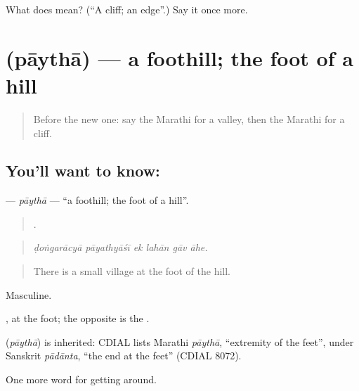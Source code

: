 \begin{tcolorbox}[breakable,colback=teal!4,colframe=teal!35!black,title={Before you move on}]
What does  mean? (\textquotedblleft{}A cliff; an edge\textquotedblright{}.) Say it once more.
\end{tcolorbox}
\section[\texorpdfstring{\mr{पायथा} (pāythā)}{पायथा (pāythā)}]{ (pāythā) — a foothill; the foot of a hill}

\label{lesson:MR-C442-paytha}



\begin{quote}
Before the new one: say the Marathi for a valley, then the Marathi for a cliff.
\end{quote}

\subsection*{You'll want to know: }
\textbf{} — \emph{pāythā} — \textquotedblleft{}a foothill; the foot of a hill\textquotedblright{}.

\begin{quote}
     .
\end{quote}

\begin{quote}
\emph{ḍoṅgarācyā pāyathyāśī ek lahān gāv āhe.}
\end{quote}

\begin{quote}
There is a small village at the foot of the hill.
\end{quote}

Masculine.

, at the foot; the opposite is the .

\begin{cousinweb}
\textbf{} (\emph{pāythā}) is inherited: CDIAL lists Marathi \emph{pāythā}, \textquotedblleft{}extremity of the feet\textquotedblright{}, under Sanskrit \emph{pādānta}, \textquotedblleft{}the end at the feet\textquotedblright{} (CDIAL 8072).
\end{cousinweb}

\begin{grammarlens}[title={What you've built}]
One more word for getting around.
\end{grammarlens}

